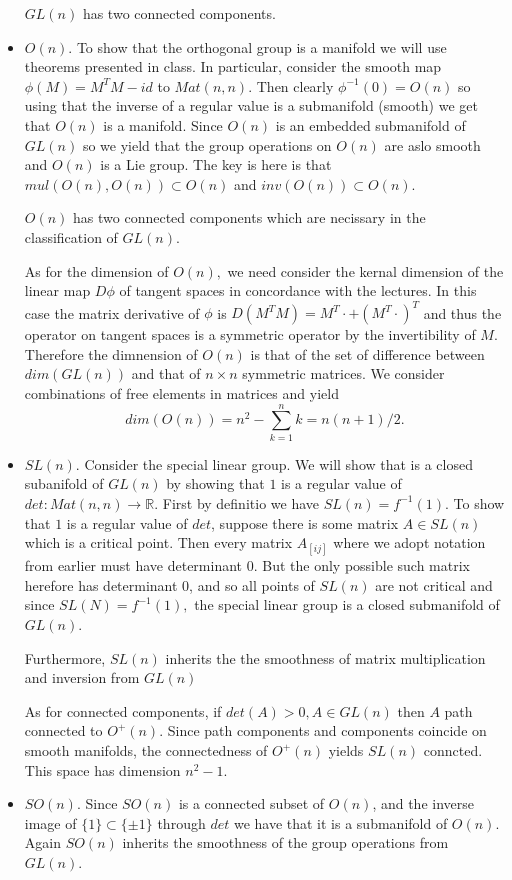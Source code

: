 \documentclass[11pt]{amsart}
\theoremstyle{definition}
\numberwithin{theorem}{section}
\numberwithin{definition}{section}
\numberwithin{equation}{section}
\begin{document}
\begin{itemize}
	$GL(n)$ has two connected components.

	\item $O(n)$. To show that the orthogonal group is a manifold we will use theorems presented in class. In particular, consider the smooth map 
	$\phi(M) = M^TM - id$ to $Mat(n,n)$. Then clearly $\phi^{-1}(0) = O(n)$ so using that the inverse of a regular value is a submanifold (smooth) we get that $O(n)$ is a manifold. Since $O(n)$ is an embedded submanifold of $GL(n)$ so we yield that the group operations on $O(n)$ are aslo smooth and $O(n)$ is a Lie group. The key is here is that $mul(O(n), O(n)) \subset O(n)$ and $inv(O(n)) \subset O(n).$

	$O(n)$ has two connected components which are necissary in the classification of $GL(n).$ 

	As for the dimension of $O(n),$ we need consider the kernal dimension of the linear map $D \phi$ of tangent spaces in concordance with the lectures.   In this case the matrix derivative of $\phi$ is
	$D (M^T M) = M^T \cdot + (M^T \cdot)^T$ and thus the operator on tangent spaces is a symmetric operator by the invertibility of $M$.  Therefore the dimnension of $O(n)$ is that of the set of difference between $dim(GL(n))$ and that of $n\times n$ symmetric matrices. We consider combinations of free elements in matrices and yield
	\begin{equation*}
		dim(O(n)) =n^2 -\sum_{k=1}^n k = n(n+1)/2.
	\end{equation*}

	\item $SL(n).$ Consider the special linear group. We will show that is a closed subanifold of $GL(n)$ by showing that $1$ is a regular value of $det: Mat(n,n) \to \mathbb{R}.$ First by definitio we have $SL(n) = f^{-1}(1).$ To show that $1$ is a regular value of $det$, suppose there is some matrix $A \in SL(n)$ which is a critical point. Then every matrix $A_{[ij]}$ where we adopt notation from earlier must have determinant $0$. But the only possible such matrix herefore has determinant $0$, and so all points of $SL(n)$ are not critical and since $SL(N) = f^{-1}(1),$ the special linear group is a closed submanifold of $GL(n).$  

	Furthermore, $SL(n)$ inherits the the smoothness of matrix multiplication and inversion from $GL(n)$

	As for connected components, if $det(A) > 0, A \in GL(n)$ then $A$ path connected to $O^{+}(n).$ Since path components and components coincide on smooth manifolds, the connectedness of $O^{+}(n)$ yields $SL(n)$ conncted. This space has dimension $n^2 -1.$

	\item $SO(n)$. Since $SO(n)$ is a connected subset of $O(n)$, and the inverse image of $\{1\} \subset \{\pm 1\}$ through $det$ we have that it is a submanifold of $O(n).$ Again $SO(n)$ inherits the smoothness of the group operations from $GL(n).$
\end{itemize}
\end{document}
